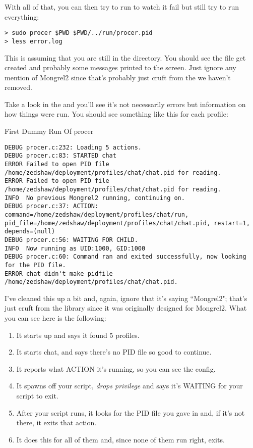 With all of that, you can then try to run  to watch
it fail but still try to run everything:

\begin{Verbatim}
> sudo procer $PWD $PWD/../run/procer.pid
> less error.log
\end{Verbatim}

This is assuming that you are still in the  directory.
You should see the file  get created and
probably some messages printed to the screen.  Just ignore any
mention of Mongrel2 since that's probably just cruft from the 
we haven't removed.

Take a look in the  and you'll see it's not necessarily
errors but information on how things were run.  You should
see something like this for each profile:

\begin{code}{First Dummy Run Of procer}
\begin{Verbatim}
DEBUG procer.c:232: Loading 5 actions.
DEBUG procer.c:83: STARTED chat
ERROR Failed to open PID file /home/zedshaw/deployment/profiles/chat/chat.pid for reading.
ERROR Failed to open PID file /home/zedshaw/deployment/profiles/chat/chat.pid for reading.
INFO  No previous Mongrel2 running, continuing on.
DEBUG procer.c:37: ACTION: command=/home/zedshaw/deployment/profiles/chat/run, pid_file=/home/zedshaw/deployment/profiles/chat/chat.pid, restart=1, depends=(null)
DEBUG procer.c:56: WAITING FOR CHILD.
INFO  Now running as UID:1000, GID:1000
DEBUG procer.c:60: Command ran and exited successfully, now looking for the PID file.
ERROR chat didn't make pidfile /home/zedshaw/deployment/profiles/chat/chat.pid.
\end{Verbatim}
\end{code}

I've cleaned this up a bit and, again, ignore that it's saying ``Mongrel2";
that's just cruft from the library since it was originally designed
for Mongrel2.  What you can see here is the following:

\begin{enumerate}
\item It starts up and says it found 5 profiles.
\item It starts chat, and says there's no PID file so good to continue.
\item It reports what ACTION it's running, so you can see the config.
\item It spawns off your  script, \emph{drops privilege}
     and says it's WAITING for your script to exit.
\item After your script runs, it looks for the PID file you gave in  and, if it's not there, it exits that action.
\item It does this for all of them and, since none of them run right,  exits.
\end{enumerate}

